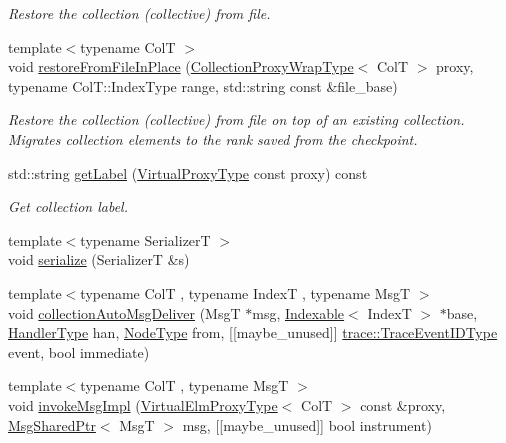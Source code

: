 \begin{DoxyCompactItemize}
\begin{DoxyCompactList}\small\item\em Restore the collection (collective) from file. \end{DoxyCompactList}\item 
{\footnotesize template$<$typename ColT $>$ }\\void \hyperlink{structvt_1_1vrt_1_1collection_1_1_collection_manager_a401419597474752d8554a6f96a972a6b}{restore\+From\+File\+In\+Place} (\hyperlink{structvt_1_1vrt_1_1collection_1_1_collection_manager_a56458ed7f9bb22b631b9b3a745f42f94}{Collection\+Proxy\+Wrap\+Type}$<$ ColT $>$ proxy, typename Col\+T\+::\+Index\+Type range, std\+::string const \&file\+\_\+base)
\begin{DoxyCompactList}\small\item\em Restore the collection (collective) from file on top of an existing collection. Migrates collection elements to the rank saved from the checkpoint. \end{DoxyCompactList}\item 
std\+::string \hyperlink{structvt_1_1vrt_1_1collection_1_1_collection_manager_a87b3cd902f7124eb9acd92dbc5895121}{get\+Label} (\hyperlink{namespacevt_a1b417dd5d684f045bb58a0ede70045ac}{Virtual\+Proxy\+Type} const proxy) const
\begin{DoxyCompactList}\small\item\em Get collection label. \end{DoxyCompactList}\item 
{\footnotesize template$<$typename SerializerT $>$ }\\void \hyperlink{structvt_1_1vrt_1_1collection_1_1_collection_manager_af9101933d9e9ca9aa0b6b1f39edbb9f0}{serialize} (SerializerT \&s)
\item 
{\footnotesize template$<$typename ColT , typename IndexT , typename MsgT $>$ }\\void \hyperlink{structvt_1_1vrt_1_1collection_1_1_collection_manager_ab0cf53c9b1b825ff71a475379f083317}{collection\+Auto\+Msg\+Deliver} (MsgT $\ast$msg, \hyperlink{structvt_1_1vrt_1_1collection_1_1_indexable}{Indexable}$<$ IndexT $>$ $\ast$base, \hyperlink{namespacevt_af64846b57dfcaf104da3ef6967917573}{Handler\+Type} han, \hyperlink{namespacevt_a866da9d0efc19c0a1ce79e9e492f47e2}{Node\+Type} from, \mbox{[}\mbox{[}maybe\+\_\+unused\mbox{]}\mbox{]} \hyperlink{namespacevt_1_1trace_a64a7185f3e102df8d8258f263ccd1582}{trace\+::\+Trace\+Event\+I\+D\+Type} event, bool immediate)
\item 
{\footnotesize template$<$typename ColT , typename MsgT $>$ }\\void \hyperlink{structvt_1_1vrt_1_1collection_1_1_collection_manager_a38b7c970eed4b80a5d3966e87ea806e3}{invoke\+Msg\+Impl} (\hyperlink{namespacevt_1_1vrt_a620a5c8c59d13e513f690c74b4af516f}{Virtual\+Elm\+Proxy\+Type}$<$ ColT $>$ const \&proxy, \hyperlink{namespacevt_ab2b3d506ec8e8d1540aede826d84a239}{Msg\+Shared\+Ptr}$<$ MsgT $>$ msg, \mbox{[}\mbox{[}maybe\+\_\+unused\mbox{]}\mbox{]} bool instrument)

\end{DoxyCompactItemize}
